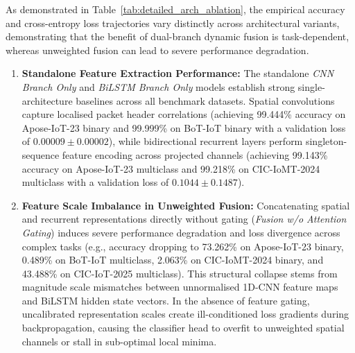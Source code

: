 \documentclass[a4paper,fleqn]{cas-sc}
\begin{document}
As demonstrated in Table~\ref{tab:detailed_arch_ablation}, the empirical accuracy and cross-entropy loss trajectories vary distinctly across architectural variants, demonstrating that the benefit of dual-branch dynamic fusion is task-dependent, whereas unweighted fusion can lead to severe performance degradation.

\begin{enumerate}
    \item \textbf{Standalone Feature Extraction Performance:} The standalone \textit{CNN Branch Only} and \textit{BiLSTM Branch Only} models establish strong single-architecture baselines across all benchmark datasets. Spatial convolutions capture localised packet header correlations (achieving 99.444\% accuracy on Apose-IoT-23 binary and 99.999\% on BoT-IoT binary with a validation loss of $0.00009 \pm 0.00002$), while bidirectional recurrent layers perform singleton-sequence feature encoding across projected channels (achieving 99.143\% accuracy on Apose-IoT-23 multiclass and 99.218\% on CIC-IoMT-2024 multiclass with a validation loss of $0.1044 \pm 0.1487$).
    
    \item \textbf{Feature Scale Imbalance in Unweighted Fusion:} Concatenating spatial and recurrent representations directly without gating (\textit{Fusion w/o Attention Gating}) induces severe performance degradation and loss divergence across complex tasks (e.g., accuracy dropping to 73.262\% on Apose-IoT-23 binary, 0.489\% on BoT-IoT multiclass, 2.063\% on CIC-IoMT-2024 binary, and 43.488\% on CIC-IoT-2025 multiclass). This structural collapse stems from magnitude scale mismatches between unnormalised 1D-CNN feature maps and BiLSTM hidden state vectors. In the absence of feature gating, uncalibrated representation scales create ill-conditioned loss gradients during backpropagation, causing the classifier head to overfit to unweighted spatial channels or stall in sub-optimal local minima.
    

\end{enumerate}
\end{document}
